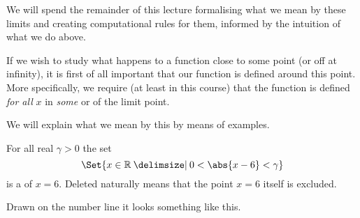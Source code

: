 We will spend the remainder of this lecture formalising what we mean by these limits and creating computational rules for them, informed by the intuition of what we do above.


If we wish to study what happens to a function close to some point (or off at infinity), it is first of all important that our function is defined around this point.
More specifically, we require (at least in this course) that the function is defined \emph{for all} $x$ in \emph{some}  or  of the limit point.

We will explain what we mean by this by means of examples.

\begin{example}
	For all real $\gamma > 0$ the set
	\[
		\Set{x \in \R \given 0 < \abs{x - 6} < \gamma}
	\]
	is a  of $x = 6$.
	Deleted naturally means that the point $x = 6$ itself is excluded.

	Drawn on the number line it looks something like this.

	\begin{figure}[H]
		\centering
	\end{figure}
\end{example}

